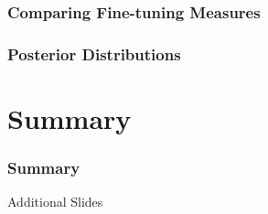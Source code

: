 \documentclass[10pt,aspectratio=169]{beamer}
\begin{document}
\begin{frame}
  \frametitle{Comparing Fine-tuning Measures}
\end{frame}

\begin{frame}
  \frametitle{Posterior Distributions}
\end{frame}

\section{Summary}

\begin{frame}
  \frametitle{Summary}
\end{frame}

\appendix

\begin{frame}
  \begin{center}
    {
      \Large
      Additional Slides
    }
  \end{center}
\end{frame}
\end{document}
